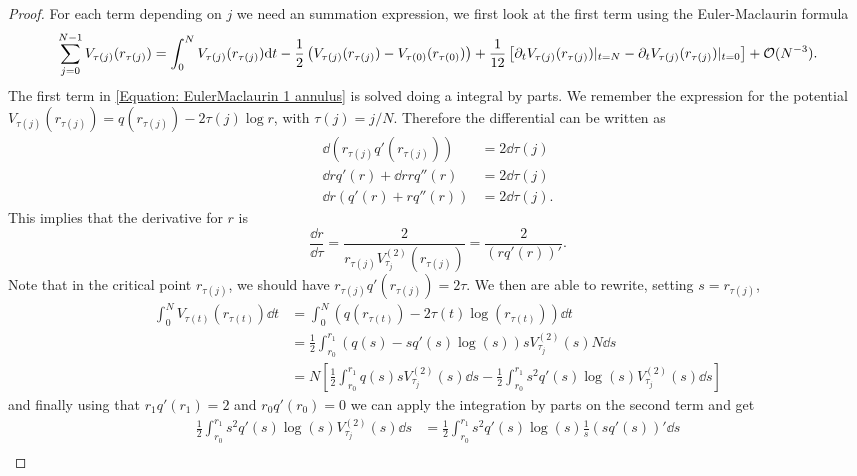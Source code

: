 \begin{proof}

For each term depending on $j$ we need an summation expression, we first look at the first term using the Euler-Maclaurin formula
\begin{equation}
	\sum_{j=0}^{N-1} V_{\tau(j)}(r_{\tau(j)}) = \int_0^N V_{\tau(j)}(r_{\tau(j)})  \mathrm{d} t - \frac{1}{2} \left( V_{\tau(j)}(r_{\tau(j)})  - V_{\tau(0)}(r_{\tau(0)}) \right) + \frac{1}{12} \left[ \partial_t V_{\tau(j)}(r_{\tau(j)}) |_{t=N} - \partial_t V_{\tau(j)}(r_{\tau(j)}) |_{t=0} \right] + \mathcal{O}(N^{-3}).
	\label{Equation: EulerMaclaurin 1 annulus}
\end{equation}
The first term in \eqref{Equation: EulerMaclaurin 1 annulus} is solved doing a integral by parts. We remember the expression for the potential $V_{\tau(j)}(r_{\tau(j)}) = q(r_{\tau(j)}) - 2 \tau(j) \log r$, with $\tau(j) = j/N$. Therefore the differential can be written as
\begin{align}
	\dd( r_{\tau(j)} q'(r_{\tau(j)}) ) & = 2 \dd \tau(j) \\
	\dd r q'(r) + \dd r r q''(r) & = 2 \dd \tau(j) \\
	\dd r (q'(r) + r q''(r)) & = 2 \dd \tau(j).
\end{align}
This implies that the derivative for $r$ is
\begin{equation}
	\frac{\dd r}{\dd \tau} = \frac{2}{r_{\tau(j)} V^{(2)}_{\tau_j}(r_{\tau(j)})} = \frac{2}{(r q'(r))'}.
\end{equation}
Note that in the critical point $r_{\tau(j)}$, we should have $r_{\tau(j)} q'(r_{\tau(j)}) = 2 \tau$. We then are able to rewrite, setting $s = r_{\tau(j)}$,
\begin{align}
	\int_0^N V_{\tau(t)}(r_{\tau(t)})  \dd t & = \int_0^N (q(r_{\tau(t)}) - 2 \tau(t) \log(r_{\tau(t)})) \dd t \\
	& = \frac{1}{2} \int_{r_0}^{r_1} (q(s) - s q'(s) \log(s)) s V^{(2)}_{\tau_j}(s) N \dd s \\
	& = N \left[  \frac{1}{2} \int_{r_0}^{r_1} q(s) s V^{(2)}_{\tau_j}(s) \dd s -  \frac{1}{2} \int_{r_0}^{r_1} s^2 q'(s) \log(s) V^{(2)}_{\tau_j}(s) \dd s \right]
\end{align}
and finally using that $r_1 q'(r_1) = 2$ and $r_0 q'(r_0) = 0$ we can apply the integration by parts on the second term and get
\begin{align}
	\frac{1}{2} \int_{r_0}^{r_1} s^2 q'(s) \log(s) V^{(2)}_{\tau_j}(s) \dd s & = \frac{1}{2} \int_{r_0}^{r_1} s^2 q'(s) \log(s) \frac{1}{s} (s q'(s))' \dd s \\

\end{align}
\end{proof}
